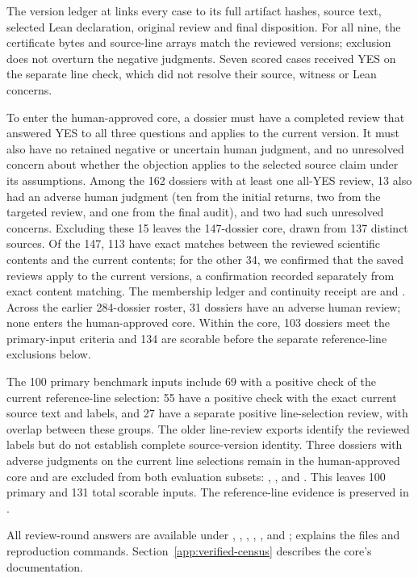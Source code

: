The version ledger at  links every case to its full artifact hashes, source text, selected Lean declaration, original review and final disposition. For all nine, the certificate bytes and source-line arrays match the reviewed versions; exclusion does not overturn the negative judgments. Seven scored cases received YES on the separate line check, which did not resolve their source, witness or Lean concerns.

To enter the human-approved core, a dossier must have a completed review that answered YES to all three questions and applies to the current version. It must also have no retained negative or uncertain human judgment, and no unresolved concern about whether the objection applies to the selected source claim under its assumptions. Among the 162 dossiers with at least one all-YES review, 13 also had an adverse human judgment (ten from the initial returns, two from the targeted review, and one from the final audit), and two had such unresolved concerns. Excluding these 15 leaves the 147-dossier core, drawn from 137 distinct sources. Of the 147, 113 have exact matches between the reviewed scientific contents and the current contents; for the other 34, we confirmed that the saved reviews apply to the current versions, a confirmation recorded separately from exact content matching. The membership ledger and continuity receipt are  and . Across the earlier 284-dossier roster, 31 dossiers have an adverse human review; none enters the human-approved core. Within the core, 103 dossiers meet the primary-input criteria and 134 are scorable before the separate reference-line exclusions below.

The 100 primary benchmark inputs include 69 with a positive check of the current reference-line selection: 55 have a positive check with the exact current source text and labels, and 27 have a separate positive line-selection review, with overlap between these groups. The older line-review exports identify the reviewed labels but do not establish complete source-version identity. Three dossiers with adverse judgments on the current line selections remain in the human-approved core and are excluded from both evaluation subsets: , , and . This leaves 100 primary and 131 total scorable inputs. The reference-line evidence is preserved in .

All review-round answers are available under , , , , , and ;  explains the files and reproduction commands. Section~\ref{app:verified-census} describes the core's documentation.
